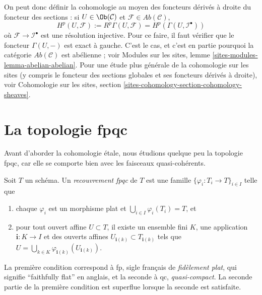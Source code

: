 \noindent
On peut donc d\'efinir la cohomologie au moyen des foncteurs d\'eriv\'es \`a droite du foncteur
des sections : si $U \in \Ob(\mathcal{C})$ et
$\mathcal{F} \in \textit{Ab}(\mathcal{C})$,
$$
H^p(U, \mathcal{F}) :=
R^p\Gamma(U, \mathcal{F}) =
H^p(\Gamma(U, \mathcal{I}^\bullet))
$$
o\`u $\mathcal{F} \to \mathcal{I}^\bullet$ est une r\'esolution injective. Pour ce faire,
il faut v\'erifier que le foncteur $\Gamma(U, -)$ est exact \`a gauche. C'est
le cas, et c'est en partie pourquoi la cat\'egorie $\textit{Ab}(\mathcal{C})$ est ab\'elienne ;
voir
Modules sur les sites, lemme \ref{sites-modules-lemma-abelian-abelian}.
Pour une \'etude plus g\'en\'erale de la cohomologie sur les sites (y compris le
foncteur des sections globales et ses foncteurs d\'eriv\'es \`a droite), voir
Cohomologie sur les sites, section \ref{sites-cohomology-section-cohomology-sheaves}.



\section{La topologie fpqc}
\label{section-fpqc}

\noindent
Avant d'aborder la cohomologie \'etale, nous \'etudions quelque peu la topologie fpqc, car
elle se comporte bien avec les faisceaux quasi-coh\'erents.

\begin{definition}
\label{definition-fpqc-covering}
Soit $T$ un sch\'ema. Un {\it recouvrement fpqc} de $T$ est une famille
$\{ \varphi_i : T_i \to T\}_{i \in I}$ telle que
\begin{enumerate}
\item chaque $\varphi_i$ est un morphisme plat et
$\bigcup_{i\in I} \varphi_i(T_i) = T$, et
\item pour tout ouvert affine $U \subset T$, il existe un ensemble fini
$K$, une application $\mathbf{i} : K \to I$ et des ouverts affines
$U_{\mathbf{i}(k)} \subset T_{\mathbf{i}(k)}$ tels que
$U = \bigcup_{k \in K} \varphi_{\mathbf{i}(k)}(U_{\mathbf{i}(k)})$.
\end{enumerate}
\end{definition}

\begin{remark}
\label{remark-fpqc}
La premi\`ere condition correspond \`a fp, sigle fran\c{c}ais de
{\it fid\`element plat}, qui signifie ``faithfully flat'' en anglais, et
la seconde \`a qc, {\it quasi-compact}.
La seconde partie de la premi\`ere condition est superflue lorsque la seconde est satisfaite.
\end{remark}


